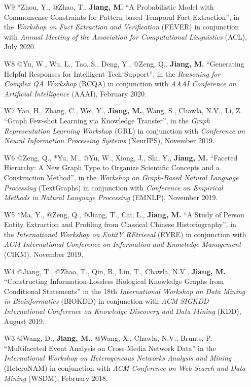 \documentclass[10pt]{article}
\newenvironment{myindentpar}[1]%
{\begin{list}{}%
         {\setlength{\leftmargin}{#1}}%
         \item[]%
}
{\end{list}}
\newcounter{list}
\begin{document}
\begin{myindentpar}{0.00cm}
\begin{enumerate}[leftmargin=.5cm]
\item[W9] *Zhou, Y., @Zhao, T., \textbf{Jiang, M.} ``A Probabilistic Model with Commonsense Constraints for Pattern-based Temporal Fact Extraction'', in the \textit{Workshop on Fact Extraction and Verification} (FEVER) in conjunction with \textit{Annual Meeting of the Association for Computational Linguistics} (ACL), July 2020.

\item[W8] @Yu, W., Wu, L., Tao, S., Deng, Y., @Zeng, Q., \textbf{Jiang, M.} ``Generating Helpful Responses for Intelligent Tech Support'', in the \textit{Reasoning for Complex QA  Workshop} (RCQA) in conjunction with \textit{AAAI Conference on Artificial Intelligence} (AAAI), February 2020.

\item[W7] Yao, H., Zhang, C., Wei, Y., \textbf{Jiang, M.}, Wang, S., Chawla, N.V., Li, Z. ``Graph Few-shot Learning via Knowledge Transfer'', in the \textit{Graph Representation Learning Workshop} (GRL) in conjunction with \textit{Conference on Neural Information Processing Systems} (NeurIPS), November 2019.
	
\item[W6] @Zeng, Q., *Yu, M., @Yu, W., Xiong, J., Shi, Y., \textbf{Jiang, M.} ``Faceted Hierarchy: A New Graph Type to Organize Scientific Concepts and a Construction Method'', in the \textit{Workshop on Graph-Based Natural Language Processing} (TextGraphs) in conjunction with \textit{Conference on Empirical Methods in Natural Language Processing} (EMNLP), November 2019.

\item[W5] *Ma, Y., @Zeng, Q., @Jiang, T., Cai, L., \textbf{Jiang, M.} ``A Study of Person Entity Extraction and Profiling from Classical Chinese Historiography'', in the \textit{International Workshop on EntitY REtrieval} (EYRE) in conjunction with \textit{ACM International Conference on Information and Knowledge Management} (CIKM), November 2019.

\item[W4] @Jiang, T., @Zhao, T., Qin, B., Liu, T., Chawla, N.V., \textbf{Jiang, M.} ``Constructing Information-Lossless Biological Knowledge Graphs from Conditional Statements'' in the 18th \textit{International Workshop on Data Mining in Bioinformatics} (BIOKDD) in conjunction with \textit{ACM SIGKDD International Conference on Knowledge Discovery and Data Mining} (KDD), August 2019.

\item[W3] @Wang, D., \textbf{Jiang, M.}, @Wang, X., Chawla, N.V., Brunts, P. ``Multifaceted Event Analysis on Cross-Media Network Data'' in the \textit{International Workshop on Heterogeneous Networks Analysis and Mining} (HeteroNAM) in conjunction with \textit{ACM Conference on Web Search and Data Mining} (WSDM), February 2018.


\end{enumerate}
\end{myindentpar}
\end{document}
